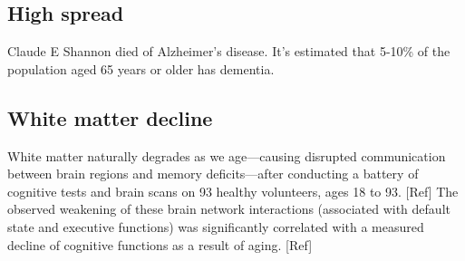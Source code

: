 \documentclass[oneside, article]{memoir}
\begin{document}
\subsection{High spread}
Claude E Shannon died of Alzheimer's disease. It's estimated that 5-10\% of the population aged 65 years or older has dementia.

\subsection{White matter decline}
White matter naturally degrades as we age—causing disrupted communication between brain regions and memory deficits—after conducting a battery of cognitive tests and brain scans on 93 healthy volunteers, ages 18 to 93. [Ref] The observed weakening of these brain network interactions (associated with default state and executive functions) was significantly correlated with a measured decline of cognitive functions as a result of aging. [Ref] 
\end{document}
